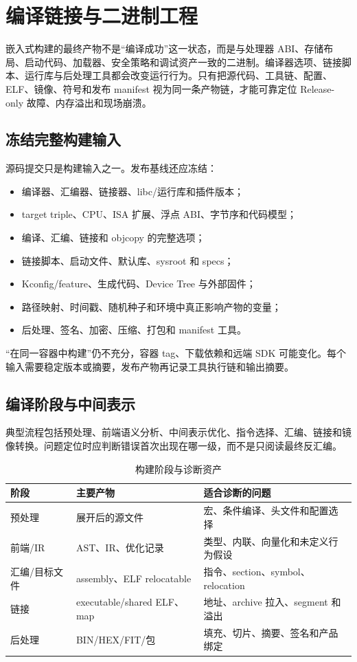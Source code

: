 \chapter{编译链接与二进制工程}
\label{chap:compiler-linker-binary}

嵌入式构建的最终产物不是“编译成功”这一状态，而是与处理器 ABI、存储布局、启动代码、加载器、安全策略和调试资产一致的二进制。编译器选项、链接脚本、运行库与后处理工具都会改变运行行为。只有把源代码、工具链、配置、ELF、镜像、符号和发布 manifest 视为同一条产物链，才能可靠定位 Release-only 故障、内存溢出和现场崩溃。

\section{冻结完整构建输入}

源码提交只是构建输入之一。发布基线还应冻结：

\begin{itemize}
  \item 编译器、汇编器、链接器、libc/运行库和插件版本；
  \item target triple、CPU、ISA 扩展、浮点 ABI、字节序和代码模型；
  \item 编译、汇编、链接和 objcopy 的完整选项；
  \item 链接脚本、启动文件、默认库、sysroot 和 specs；
  \item Kconfig/feature、生成代码、Device Tree 与外部固件；
  \item 路径映射、时间戳、随机种子和环境中真正影响产物的变量；
  \item 后处理、签名、加密、压缩、打包和 manifest 工具。
\end{itemize}

“在同一容器中构建”仍不充分，容器 tag、下载依赖和远端 SDK 可能变化。每个输入需要稳定版本或摘要，发布产物再记录工具执行链和输出摘要。

\section{编译阶段与中间表示}

典型流程包括预处理、前端语义分析、中间表示优化、指令选择、汇编、链接和镜像转换。问题定位时应判断错误首次出现在哪一级，而不是只阅读最终反汇编。

\begin{table}[H]
  \centering
  \caption{构建阶段与诊断资产}
  \begin{tabular}{p{30mm}p{45mm}p{64mm}}
    \hline
    阶段 & 主要产物 & 适合诊断的问题 \\
    \hline
    预处理 & 展开后的源文件 & 宏、条件编译、头文件和配置选择 \\
    前端/IR & AST、IR、优化记录 & 类型、内联、向量化和未定义行为假设 \\
    汇编/目标文件 & assembly、ELF relocatable & 指令、section、symbol、relocation \\
    链接 & executable/shared ELF、map & 地址、archive 拉入、segment 和溢出 \\
    后处理 & BIN/HEX/FIT/包 & 填充、切片、摘要、签名和产品绑定 \\
    \hline
  \end{tabular}
\end{table}

